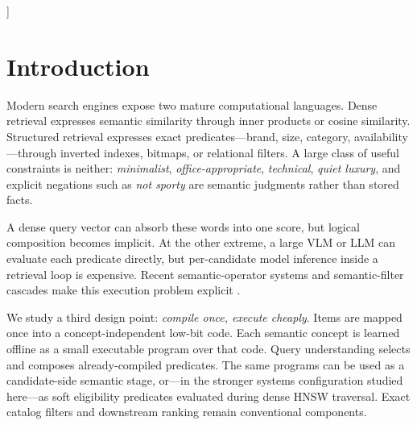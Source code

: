 \begin{@twocolumnfalse}
\begin{abstract}
We then execute the compiled predicates \emph{inside} HNSW traversal. On the strict first held-out split, using 1,000 queries for each of three predetermined three-predicate sets, $K=50$, and semantic selectivities from 50\% to 2\%, live Binary1 execution reaches Traversal Recall@50 between 0.955 and 0.992. A selectivity-aware HNSW over-fetch baseline swept up to $2\times K/s$ candidates, where $s$ is the eligible fraction, does not come within 0.005 recall of live traversal in any of the 15 predicate-set/selectivity conditions. At 5\% and 2\% selectivity, live traversal is also faster on average than this largest tested over-fetch point (9.82 vs. 10.27\,ms and 14.57 vs. 20.14\,ms) while retaining substantially higher traversal recall. The incremental compiled-predicate cost is approximately 96--134\,ns per predicate invocation, or 0.16--0.22 of the measured scalar 384-D dot-product cost on the same CPU. The strongest supported result is therefore a systems one: reusable soft predicates can be compiled into tiny programs over a shared low-bit substrate and executed directly during ANN search with a favorable quality--memory--latency trade-off.
\end{abstract}
\vspace{0.7em}
\end{@twocolumnfalse}
]

\section{Introduction}
Modern search engines expose two mature computational languages. Dense retrieval expresses semantic similarity through inner products or cosine similarity. Structured retrieval expresses exact predicates---brand, size, category, availability---through inverted indexes, bitmaps, or relational filters. A large class of useful constraints is neither: \emph{minimalist}, \emph{office-appropriate}, \emph{technical}, \emph{quiet luxury}, and explicit negations such as \emph{not sporty} are semantic judgments rather than stored facts.

A dense query vector can absorb these words into one score, but logical composition becomes implicit. At the other extreme, a large VLM or LLM can evaluate each predicate directly, but per-candidate model inference inside a retrieval loop is expensive. Recent semantic-operator systems and semantic-filter cascades make this execution problem explicit \citep{patel2025lotus,kim2026semanticfilter,dong2026compilation}.

We study a third design point: \emph{compile once, execute cheaply}. Items are mapped once into a concept-independent low-bit code. Each semantic concept is learned offline as a small executable program over that code. Query understanding selects and composes already-compiled predicates. The same programs can be used as a candidate-side semantic stage, or---in the stronger systems configuration studied here---as soft eligibility predicates evaluated during dense HNSW traversal. Exact catalog filters and downstream ranking remain conventional components.

